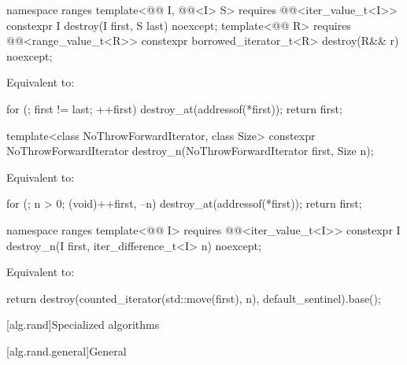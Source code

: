 %
\begin{itemdecl}
namespace ranges {
  template<@@ I, @@<I> S>
    requires @@<iter_value_t<I>>
    constexpr I destroy(I first, S last) noexcept;
  template<@@ R>
    requires @@<range_value_t<R>>
    constexpr borrowed_iterator_t<R> destroy(R&& r) noexcept;
}
\end{itemdecl}

\begin{itemdescr}
\pnum
\effects
Equivalent to:
\begin{codeblock}
for (; first != last; ++first)
  destroy_at(addressof(*first));
return first;
\end{codeblock}
\end{itemdescr}

%
\begin{itemdecl}
template<class NoThrowForwardIterator, class Size>
  constexpr NoThrowForwardIterator destroy_n(NoThrowForwardIterator first, Size n);
\end{itemdecl}

\begin{itemdescr}
\pnum
\effects
Equivalent to:
\begin{codeblock}
for (; n > 0; (void)++first, --n)
  destroy_at(addressof(*first));
return first;
\end{codeblock}
\end{itemdescr}

%
\begin{itemdecl}
namespace ranges {
  template<@@ I>
    requires @@<iter_value_t<I>>
    constexpr I destroy_n(I first, iter_difference_t<I> n) noexcept;
}
\end{itemdecl}

\begin{itemdescr}
\pnum
\effects
Equivalent to:
\begin{codeblock}
return destroy(counted_iterator(std::move(first), n), default_sentinel).base();
\end{codeblock}
\end{itemdescr}

[alg.rand]{Specialized  algorithms}

[alg.rand.general]{General}

